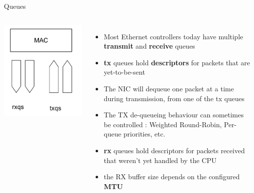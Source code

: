 \begin{frame}{Queues}
	\begin{columns}
		\includegraphics[width=\textwidth]{slides/networking-driver-netdev/queues.pdf}
	\begin{itemize}
		\item Most Ethernet controllers today have multiple \textbf{transmit} and \textbf{receive} queues
		\item \textbf{tx} queues hold \textbf{descriptors} for packets that are yet-to-be-sent
		\item The NIC will dequeue one packet at a time during transmission, from one of the tx queues
		\item The TX de-queueing behaviour can sometimes be controlled : Weighted Round-Robin, Per-queue priorities, etc.
		\item \textbf{rx} queues hold descriptors for packets received that weren't yet handled by the CPU
		\item the RX buffer size depends on the configured \textbf{MTU}
	\end{itemize}
	\end{columns}
\end{frame}

